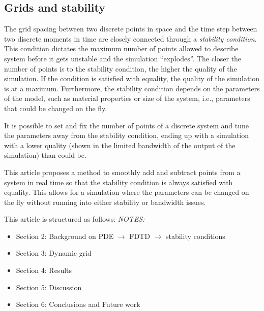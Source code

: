 \documentclass[preprint]{JASA}
\begin{document}
\subsection{Grids and stability}
The grid spacing between two discrete points in space and the time step between two discrete moments in time are closely connected through a \textit{stability condition}. This condition dictates the maximum number of points allowed to describe system before it gets unstable and the simulation ``explodes''. The closer the number of points is to the stability condition, the higher the quality of the simulation. If the condition is satisfied with equality, the quality of the simulation is at a maximum. 
Furthermore, the stability condition depends on the parameters of the model, such as material properties or size of the system, i.e., parameters that could be changed on the fly.

It is possible to set and fix the number of points of a discrete system and tune the parameters away from the stability condition, ending up with a simulation with a lower quality (shown in the limited bandwidth of the output of the simulation) than could be.

This article proposes a method to smoothly add and subtract points from a system in real time so that the stability condition is always satisfied with equality. This allows for a simulation where the parameters can be changed on the fly without running into either stability or bandwidth issues. 

This article is structured as follows: 
\textit{NOTES:}
\begin{itemize}
\item Section 2: Background on PDE $\rightarrow$ FDTD $\rightarrow$ stability conditions 
\item Section 3: Dynamic grid
\item Section 4: Results
\item Section 5: Discussion
\item Section 6: Conclusions and Future work
\end{itemize}
\end{document}
